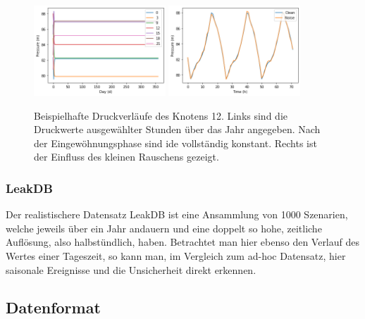 \begin{figure}[h]
    \centering
    \includegraphics[width=0.44\textwidth]{res/practice-noise-days.png}
    \includegraphics[width=0.44\textwidth]{res/practice-noise-applied.png}
    \caption{Beispielhafte Druckverläufe des Knotens 12. Links sind die Druckwerte ausgewählter Stunden über das
        Jahr angegeben. Nach der Eingewöhnungsphase sind ide vollständig konstant. Rechts ist der Einfluss des
        kleinen Rauschens gezeigt.}
    \label{fig:practice-noise}
\end{figure}

\subsubsection*{LeakDB}

Der realistischere Datensatz LeakDB \cite{vrachimis2018leakdb} ist eine Ansammlung von 1000 Szenarien, welche
 jeweils über ein Jahr andauern und eine doppelt so hohe, zeitliche Auflösung, also halbstündlich, haben.
 Betrachtet man hier ebenso den Verlauf des Wertes einer Tageszeit, so kann man, im Vergleich zum ad-hoc
 Datensatz, hier saisonale Ereignisse und die Unsicherheit direkt erkennen.

\subsection*{Datenformat}

